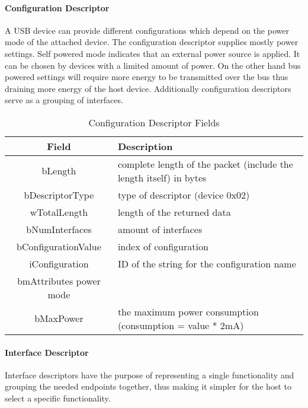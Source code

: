 \paragraph{Configuration Descriptor}
A USB device can provide different configurations which depend on the power mode of the attached device. The configuration descriptor supplies mostly 
power settings. Self powered mode indicates that an external power source is applied. It can be chosen by devices with a limited amount of power. On 
the other hand bus powered settings will require more energy to be transmitted over the bus thus draining more energy of the host device. Additionally 
configuration descriptors serve as a grouping of interfaces.
\begin{table}
\begin{tabular}{c|p{10 cm}} 
Field & Description \\ \hline
bLength & complete length of the packet (include the length itself) in bytes \\
bDescriptorType & type of descriptor (device 0x02)\\
wTotalLength & length of the returned data \\
bNumInterfaces & amount of interfaces\\
bConfigurationValue & index of configuration \\
iConfiguration & ID of the string for the configuration name\\
bmAttributes  power mode\\
bMaxPower & the maximum power consumption (consumption = value * 2mA) \\
\end{tabular}
 \caption{Configuration Descriptor Fields}
\end{table}


\paragraph{Interface Descriptor}
Interface descriptors have the purpose of representing a single functionality and grouping the needed endpoints together, thus making 
it simpler for the host to select a specific functionality.

